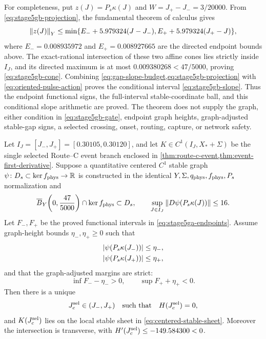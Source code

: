 For completeness, put \(z(J)=P_s\kappa(J)\) and
\(W=J_+-J_-=3/20000\).  From \cref{eq:stage5gb-projection}, the fundamental
theorem of calculus gives
\[
 \left\lVert z(J)\right\rVert_Y\le
 \min\{E_-+5.979324(J-J_-),
        E_++5.979324(J_+-J)\},
\]
where \(E_-=0.008935972\) and \(E_+=0.008927665\) are the directed endpoint
bounds above.  The exact-rational
intersection of these two affine cones lies strictly inside \(I_J\), and its
directed maximum is at most
\(0.009380268<47/5000\), proving \cref{eq:stage5gb-cone}.  Combining
\cref{eq:gap-slope-budget,eq:stage5gb-projection} with
\cref{eq:oriented-pulse-action} proves the conditional interval
\cref{eq:stage5gb-slope}.  Thus the endpoint functional signs, the
full-interval stable-coordinate ball, and this conditional slope arithmetic
are proved.  The theorem does not supply the graph, either condition in
\cref{eq:stage5gb-gate}, endpoint graph heights, graph-adjusted stable-gap
signs, a selected crossing, onset, routing, capture, or network safety.

\begin{proposition}
\label{prop:selected-center-crossing}
Let \(I_J=[J_-,J_+]=[0.30105,0.30120]\), and let
\(K\in C^1(I_J,X_*+\Sigma)\) be the single selected Route--C event branch enclosed in
\cref{thm:route-c-event,thm:event-first-derivative}.  Suppose a quantitative
centered \(C^1\) stable graph
\(\psi\colon D_s\subset\ker f_{\rm phys}\to\mathbb R\) is constructed in the identical
\(Y,\Sigma,q_{\rm phys},f_{\rm phys},P_s\) normalization and
\begin{equation}
 \overline B_Y\!\left(0,\frac{47}{5000}\right)
       \cap\ker f_{\rm phys}\subset D_s,
 \qquad
 \sup_{J\in I_J}\left\lVert D\psi(P_s\kappa(J))\right\rVert\le16.     \label{eq:center-crossing-graph-data}
\end{equation}
Let \(F_-,F_+\) be the proved functional intervals in
\cref{eq:stage5ga-endpoints}.  Assume graph-height bounds
\(\eta_-,\eta_+\ge0\) such that
\begin{equation}
 \begin{aligned}
 \left\lvert\psi(P_s\kappa(J_-))\right\rvert&\le\eta_-,\\
 \left\lvert\psi(P_s\kappa(J_+))\right\rvert&\le\eta_+,
 \end{aligned}                                        \label{eq:center-crossing-endpoint-data}
\end{equation}
and that the graph-adjusted margins are strict:
\begin{equation}
 \inf F_- -\eta_->0,
 \qquad
 \sup F_+ +\eta_+<0.                                  \label{eq:center-crossing-margins}
\end{equation}
Then there is a unique
\begin{equation}
 J_c^{\rm sel}\in(J_-,J_+)
 \quad\text{such that}\quad
 H(J_c^{\rm sel})=0,                                  \label{eq:selected-center-root}
\end{equation}
and \(K(J_c^{\rm sel})\) lies on the local stable sheet in
\cref{eq:centered-stable-sheet}.  Moreover the intersection is transverse,
with \(H'(J_c^{\rm sel})\le-149.584300<0\).
\end{proposition}

